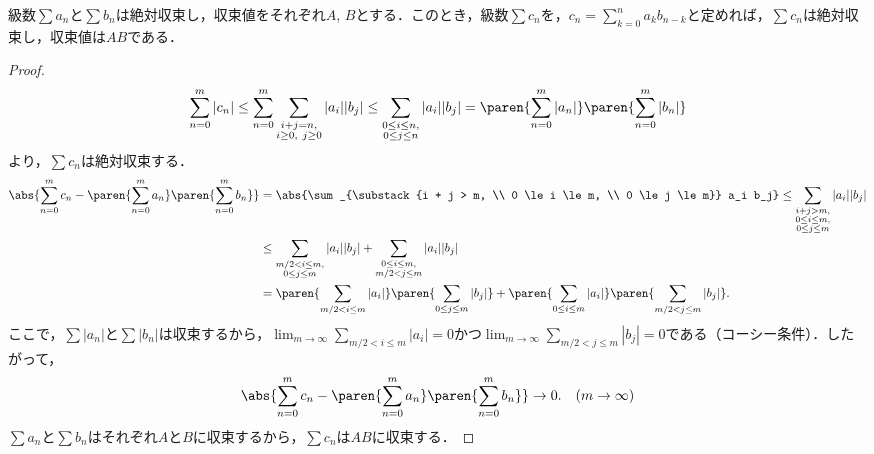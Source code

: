 \documentclass[a4paper,10pt]{ltjsarticle}
\begin{document}
\begin{MyProposition}
  級数\(\sum a_n\)と\(\sum b_n\)は絶対収束し，収束値をそれぞれ\(A\), \(B\)とする．このとき，級数\(\sum c_n\)を，\(c_n = \sum_{k=0}^n a_k b_{n-k}\)と定めれば，\(\sum c_n\)は絶対収束し，収束値は\(AB\)である．
\end{MyProposition}
\begin{proof}
  \[ \sum_{n=0}^m |c_n| \le \sum_{n=0}^m\sum_{\substack{i+j=n,\\ i\ge0,\ j\ge0}}|a_i||b_j| \le \sum_{\substack{0 \le i \le n, \\ 0 \le j \le n}}|a_i||b_j| = \paren{\sum_{n=0}^m|a_n|}\paren{\sum_{n=0}^m|b_n|} \]
  より，\(\sum c_n\)は絶対収束する．
  \begin{align*}
    \abs{\sum_{n=0}^m c_n - \paren{\sum_{n=0}^m a_n}\paren{\sum_{n=0}^m b_n}} & = \abs{\sum_{\substack{i + j > m,                                                                                                              \\ 0 \le i \le m, \\ 0 \le j \le m}} a_i b_j} \le \sum_{\substack{i + j > m, \\ 0 \le i \le m, \\ 0 \le j \le m}} |a_i||b_j| \\
                                                                              & \le \sum_{\substack{m/2 < i \le m,                                                                                                             \\ 0 \le j \le m}} |a_i||b_j| + \sum_{\substack{0 \le i \le m, \\ m/2 < j \le m}} |a_i||b_j| \\
                                                                              & = \paren{\sum_{m/2 < i \le m} |a_i|}\paren{\sum_{0 \le j \le m} |b_j|} + \paren{\sum_{0 \le i \le m} |a_i|}\paren{\sum_{m/2 < j \le m} |b_j|}.
  \end{align*}
  ここで，\(\sum |a_n|\)と\(\sum |b_n|\)は収束するから，\(\lim_{m\to\infty}\sum_{m/2 < i \le m} |a_i| = 0\)かつ\(\lim_{m\to\infty}\sum_{m/2 < j \le m} |b_j| = 0\)である（コーシー条件）．したがって，
  \[ \abs{\sum_{n=0}^m c_n - \paren{\sum_{n=0}^m a_n}\paren{\sum_{n=0}^m b_n}} \to 0. \quad (m \to \infty) \]
  \(\sum a_n\)と\(\sum b_n\)はそれぞれ\(A\)と\(B\)に収束するから，\(\sum c_n\)は\(AB\)に収束する．
\end{proof}
\end{document}
